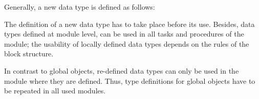 Generally, a new data type is defined as follows:

\begin{grammarframe}

\end{grammarframe}

The definition of a new data type has to take place before its use.
Besides, data types defined at module level, can be used in all tasks
and procedures of the module; the usability of locally defined data
types depends on the rules of the block structure.

In contrast to global objects, re-defined data types can only be used
in the module where they are defined. Thus, type definitions for
global objects have to be repeated in all used modules.

